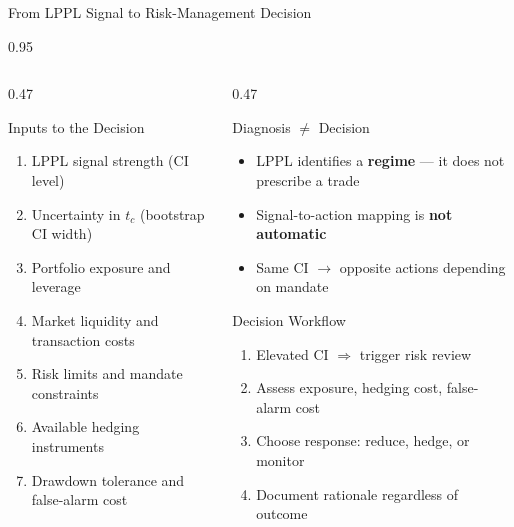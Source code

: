 \documentclass[9pt, aspectratio=169, t]{beamer}
\begin{document}
\begin{frame}{From LPPL Signal to Risk-Management Decision}
    \begin{cminipage}{0.95\textwidth}
    {\scriptsize
    \begin{columns}[T]
        \begin{column}{0.47\textwidth}
            \begin{block}{Inputs to the Decision}
                \begin{enumerate}\setlength{\itemsep}{0pt}
                    \item LPPL signal strength (CI level)
                    \item Uncertainty in $t_c$ (bootstrap CI width)
                    \item Portfolio exposure and leverage
                    \item Market liquidity and transaction costs
                    \item Risk limits and mandate constraints
                    \item Available hedging instruments
                    \item Drawdown tolerance and false-alarm cost
                \end{enumerate}
            \end{block}
        \end{column}
        \begin{column}{0.47\textwidth}
            \begin{alertblock}{Diagnosis $\neq$ Decision}
                \begin{itemize}\setlength{\itemsep}{0pt}
                    \item LPPL identifies a \textbf{regime} --- it does not prescribe a trade
                    \item Signal-to-action mapping is \textbf{not automatic}
                    \item Same CI $\to$ opposite actions depending on mandate
                \end{itemize}
            \end{alertblock}
            \vspace{-2mm}
            \begin{exampleblock}{Decision Workflow}
                \begin{enumerate}\setlength{\itemsep}{0pt}
                    \item Elevated CI $\Rightarrow$ trigger risk review
                    \item Assess exposure, hedging cost, false-alarm cost
                    \item Choose response: reduce, hedge, or monitor
                    \item Document rationale regardless of outcome
                \end{enumerate}
            \end{exampleblock}
        \end{column}
    \end{columns}
    }
    \end{cminipage}
\end{frame}
\end{document}
